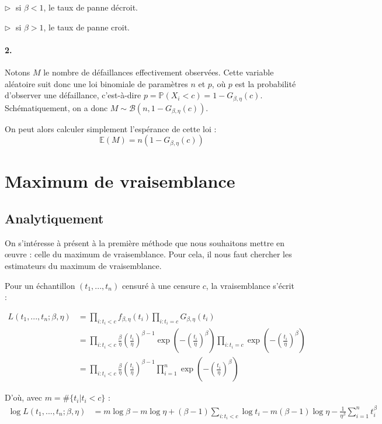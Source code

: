 \documentclass[a4paper]{report}
\begin{document}
 $\triangleright \; $ si $\beta<1$, le taux de panne décroit.
 
  $\triangleright \; $ si $\beta>1$, le taux de panne croit.
  
  \subsubsection{2.}
  Notons $M$ le nombre de défaillances effectivement observées. Cette variable aléatoire suit donc une loi binomiale de paramètres $n$ et $p$, où $p$ est la probabilité d’observer une défaillance, c'est-à-dire $p=\mathbb{P}(X_i<c)=1-G_{\beta,\eta}(c)$. Schématiquement, on a donc $M \sim \mathcal{B}(n,1-G_{\beta,\eta}(c))$.
  
  On peut alors calculer simplement l'espérance de cette loi :
  \[\mathbb{E}(M)=n(1-G_{\beta,\eta}(c))\]
  
  
  \chapter {Maximum de vraisemblance}
  
    \section{Analytiquement \label{sec:calculEMV}}
    
    On s'intéresse à présent à la première méthode que nous souhaitons mettre en œuvre : celle du maximum de vraisemblance. Pour cela, il nous faut chercher les estimateurs du maximum de vraisemblance.
    
    Pour un échantillon $(t_1,...,t_n)$ censuré à une censure $c$, la vraisemblance s'écrit :
    
    \begin{align*}
	L(t_1,...,t_n;\beta,\eta) & = \prod_{i:t_i<c} {f_{\beta,\eta}(t_i)}  \prod_{i:t_i=c} {G_{\beta,\eta}(t_i)} \\
	& =  \prod_{i:t_i<c}{\frac{\beta}{\eta} \left(\frac{t_i}{\eta}\right)^{\beta-1}\exp\left(-\left(\frac{t_i}{\eta}\right)^{\beta}\right) }  \prod_{i:t_i=c} {\exp\left(-\left(\frac{t_i}{\eta}\right)^{\beta}\right)}\\
	& = \prod_{i:t_i<c}{\frac{\beta}{\eta} \left(\frac{t_i}{\eta}\right)^{\beta-1} }  \prod_{i=1}^{n} {\exp\left(-\left(\frac{t_i}{\eta}\right)^{\beta}\right)}
	\end{align*}
	
	D'où, avec $m= \# \{t_i | t_i<c\}$  :
	\begin{align*}
	\log L(t_1,...,t_n;\beta,\eta) & = m \log \beta - m\log \eta + (\beta-1)\sum_{i:t_i<c}{\log t_i} - m(\beta-1)\log \eta - \frac{1}{\eta^\beta} \sum_{i=1}^{n} {t_i^\beta}
     \end{align*}
     
\end{document}
